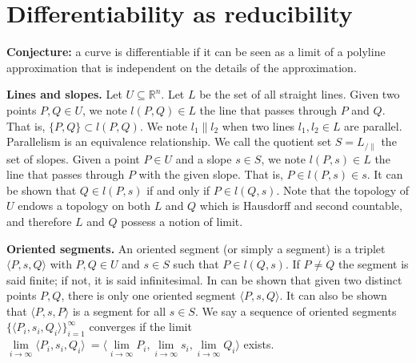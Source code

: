 \documentclass[10pt, onecolumn, longbibliography, nofootinbib]{revtex4-2}
\begin{document}

\section{Differentiability as reducibility}




\textbf{Conjecture:} a curve is differentiable if it can be seen as a limit of a polyline approximation that is independent on the details of the approximation.

\textbf{Lines and slopes.} Let $U \subseteq \mathbb{R}^n$. Let $L$ be the set of all straight lines. Given two points $P, Q \in U$, we note $l(P,Q) \in L$ the line that passes through $P$ and $Q$. That is, $\{P, Q\} \subset l(P,Q)$. We note $l_1 \parallel l_2$ when two lines $l_1, l_2 \in L$ are parallel. Parallelism is an equivalence relationship. We call the quotient set $S = L_{/\parallel}$ the set of slopes. Given a point $P \in U$ and a slope $s \in S$, we note $l(P, s) \in L$ the line that passes through $P$ with the given slope. That is, $P \in l(P, s) \in s$. It can be shown that $Q \in l(P, s)$ if and only if $P \in l(Q, s)$. Note that the topology of $U$ endows a topology on both $L$ and $Q$ which is Hausdorff and second countable, and therefore $L$ and $Q$ possess a notion of limit. 

\textbf{Oriented segments.} An oriented segment (or simply a segment) is a triplet $\langle P, s, Q \rangle$ with $P, Q \in U$ and $s \in S$ such that $P \in l(Q,s)$. If $P \neq Q$ the segment is said finite; if not, it is said infinitesimal. In can be shown that given two distinct points $P, Q$, there is only one oriented segment $\langle P, s, Q \rangle$. It can also be shown that $\langle P, s, P \rangle$ is a segment for all $s \in S$. We say a sequence of oriented segments $\{\langle P_i, s_i, Q_i \rangle\}_{i=1}^{\infty}$ converges if the limit $\lim\limits_{i \to \infty} \langle P_i, s_i, Q_i \rangle\ = \langle \lim\limits_{i \to \infty} P_i, \lim\limits_{i \to \infty} s_i, \lim\limits_{i \to \infty} Q_i \rangle$ exists.
\end{document}
